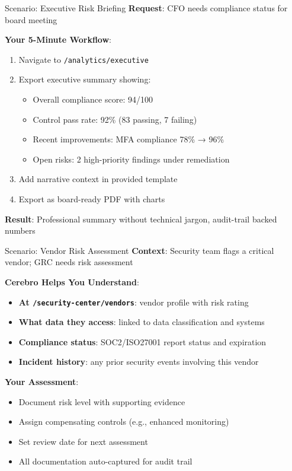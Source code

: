 \documentclass[aspectratio=169]{beamer}
\begin{document}
\begin{frame}{Scenario: Executive Risk Briefing}
  \textbf{Request}: CFO needs compliance status for board meeting
  
  \vspace{0.3cm}
  
  \textbf{Your 5-Minute Workflow}:
  \begin{enumerate}
    \item Navigate to \texttt{/analytics/executive}
    \item Export executive summary showing:
      \begin{itemize}
        \item Overall compliance score: 94/100
        \item Control pass rate: 92\% (83 passing, 7 failing)
        \item Recent improvements: MFA compliance 78\% → 96\%
        \item Open risks: 2 high-priority findings under remediation
      \end{itemize}
    \item Add narrative context in provided template
    \item Export as board-ready PDF with charts
  \end{enumerate}
  
  \vspace{0.3cm}
  
  \textbf{Result}: Professional summary without technical jargon, audit-trail backed numbers
\end{frame}

\begin{frame}{Scenario: Vendor Risk Assessment}
  \textbf{Context}: Security team flags a critical vendor; GRC needs risk assessment
  
  \vspace{0.3cm}
  
  \textbf{Cerebro Helps You Understand}:
  \begin{itemize}
    \item \textbf{At \texttt{/security-center/vendors}}: vendor profile with risk rating
    \item \textbf{What data they access}: linked to data classification and systems
    \item \textbf{Compliance status}: SOC2/ISO27001 report status and expiration
    \item \textbf{Incident history}: any prior security events involving this vendor
  \end{itemize}
  
  \vspace{0.3cm}
  
  \textbf{Your Assessment}:
  \begin{itemize}
    \item Document risk level with supporting evidence
    \item Assign compensating controls (e.g., enhanced monitoring)
    \item Set review date for next assessment
    \item All documentation auto-captured for audit trail
  \end{itemize}
\end{frame}
\end{document}

